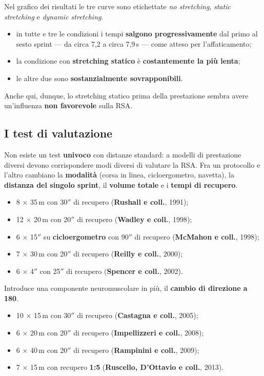 Nel grafico dei risultati le tre curve sono etichettate \textit{no stretching}, \textit{static
stretching} e \textit{dynamic stretching}.
\begin{itemize}
  \item in tutte e tre le condizioni i tempi \textbf{salgono progressivamente} dal primo al sesto
    sprint --- da circa 7,2 a circa 7,9\,s --- come atteso per l'affaticamento;
  \item la condizione con \textbf{stretching statico} è \textbf{costantemente la più lenta};
  \item le altre due sono \textbf{sostanzialmente sovrapponibili}.
\end{itemize}

Anche qui, dunque, lo stretching statico prima della prestazione sembra avere un'influenza
\textbf{non favorevole} sulla RSA.

\subsection{I test di valutazione}

Non esiste un test \textbf{univoco} con distanze standard: a modelli di prestazione diversi devono
corrispondere modi diversi di valutare la RSA. Fra un protocollo e l'altro cambiano la
\textbf{modalità} (corsa in linea, cicloergometro, navetta), la \textbf{distanza del singolo
sprint}, il \textbf{volume totale} e i \textbf{tempi di recupero}.

\begin{itemize}
  \item 8 $\times$ 35\,m con 30$''$ di recupero (\textbf{Rushall e coll.}, 1991);
  \item 12 $\times$ 20\,m con 20$''$ di recupero (\textbf{Wadley e coll.}, 1998);
  \item 6 $\times$ 15$''$ su \textbf{cicloergometro} con 90$''$ di recupero
    (\textbf{McMahon e coll.}, 1998);
  \item 7 $\times$ 30\,m con 20$''$ di recupero (\textbf{Reilly e coll.}, 2000);
  \item 6 $\times$ 4$''$ con 25$''$ di recupero (\textbf{Spencer e coll.}, 2002).
\end{itemize}

Introduce una componente neuromuscolare in più, il \textbf{cambio di direzione a
180\textdegree}.
\begin{itemize}
  \item 10 $\times$ 15\,m con 30$''$ di recupero (\textbf{Castagna e coll.}, 2005);
  \item 6 $\times$ 20\,m con 20$''$ di recupero (\textbf{Impellizzeri e coll.}, 2008);
  \item 6 $\times$ 40\,m con 20$''$ di recupero (\textbf{Rampinini e coll.}, 2009);
  \item 7 $\times$ 15\,m con recupero \textbf{1:5} (\textbf{Ruscello, D'Ottavio e coll.}, 2013).
\end{itemize}

